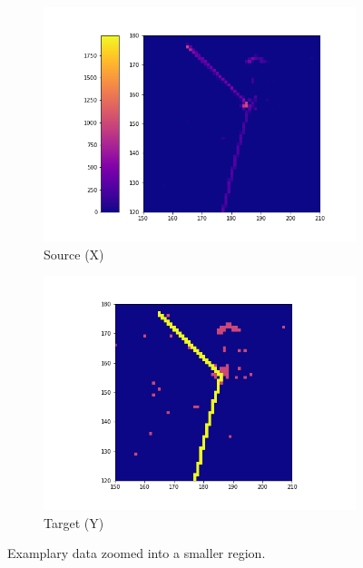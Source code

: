 \begin{figure}[H]
\centering
\begin{subfigure}[b]{0.47\textwidth}
    \centering
    \includegraphics[width=\linewidth]{figures/chapter7/examplary_data_zoom_source.png}
\caption{Source (X)}
   \label{plot:lartpc-example-source-zoom}
  \end{subfigure}
\begin{subfigure}[b]{0.47\textwidth}
    \centering
    \includegraphics[width=\linewidth]{figures/chapter7/examplary_data_zoom_target.png}
\caption{Target (Y)}
    \label{plot:lartpc-example-target-zoom}
  \end{subfigure}
  \caption[Examples of zoom]{Examplary data zoomed into a smaller region.}

    \label{plot:lartpc-example-zoom}
\end{figure}



